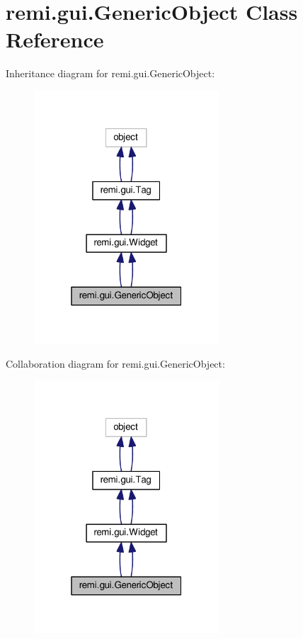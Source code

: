 \hypertarget{classremi_1_1gui_1_1GenericObject}{}\section{remi.\+gui.\+Generic\+Object Class Reference}
\label{classremi_1_1gui_1_1GenericObject}


Inheritance diagram for remi.\+gui.\+Generic\+Object\+:
\nopagebreak
\begin{figure}[H]
\begin{center}
\leavevmode
\includegraphics[width=196pt]{d9/d0d/classremi_1_1gui_1_1GenericObject__inherit__graph}
\end{center}
\end{figure}


Collaboration diagram for remi.\+gui.\+Generic\+Object\+:
\nopagebreak
\begin{figure}[H]
\begin{center}
\leavevmode
\includegraphics[width=196pt]{de/d07/classremi_1_1gui_1_1GenericObject__coll__graph}
\end{center}
\end{figure}
